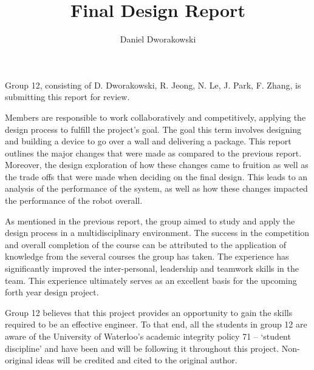 \documentclass[ece]{uw-wkrpt}
\begin{document}

\title{Final Design Report}

\author{Daniel Dworakowski}
\address{University of Waterloo,\\*
        Waterloo, ON\ \ N2L 3G1}
\employeraddress{}
\maketitle

\frontmatter

% 
\begin{letter}
Group 12, consisting of D. Dworakowski, R. Jeong, N. Le, J. Park, F. Zhang, is submitting this report for review.

Members are responsible to work collaboratively and competitively, applying the design process to fulfill the project’s goal. The goal this term involves designing and building a device to go over a wall and delivering a package. This report outlines the major changes that were made as compared to the previous report. Moreover, the design exploration of how these changes came to fruition as well as the trade offs that were made when deciding on the final design. This leads to an analysis of the performance of the system, as well as how these changes impacted the performance of the robot overall.

As mentioned in the previous report, the group aimed to study and apply the design process in a multidisciplinary environment. The success in the competition and overall completion of the course can be attributed to the application of knowledge from the several courses the group has taken. The experience has significantly improved the inter-personal, leadership and teamwork skills in the team. This experience ultimately serves as an excellent basis for the upcoming forth year design project. 

Group 12 believes that this project provides an opportunity to gain the skills required to be an effective engineer. To that end, all the students in group 12 are aware of the University of Waterloo’s academic integrity policy 71 – ‘student discipline’ and have been and will be following it throughout this project. Non-original ideas will be credited and cited to the original author.

\end{letter}
% 
\end{document}
